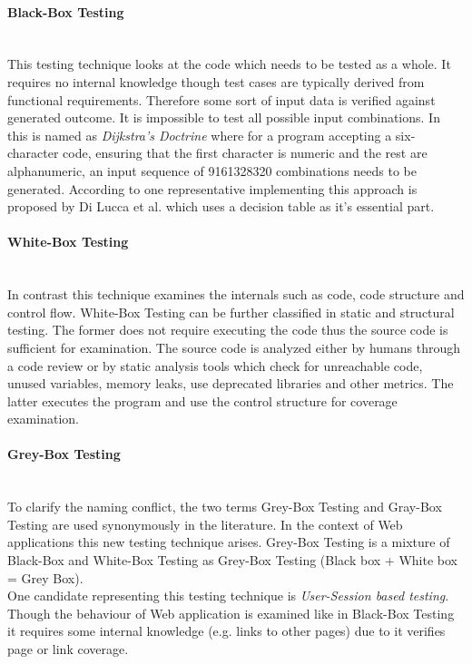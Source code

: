 \documentclass[12pt, notitlepage]{article}
\begin{document}
\paragraph{Black-Box Testing} ~\\
This testing technique looks at the code which needs to be tested as a whole. It requires no internal knowledge though test cases are typically 
derived from functional requirements. Therefore some sort of input data is verified against generated outcome.
It is impossible to test all possible input combinations. In \cite{softare-testing-principles} this is named as \textit{Dijkstra's Doctrine}
where for a program accepting a six-character code, ensuring that the first character is numeric and the rest are alphanumeric, an input 
sequence of 9161328320 combinations needs to be generated.
According to \cite{testing-overview} one representative implementing this approach is proposed by Di Lucca et al.\cite{decision-table-testing} which uses a decision table as it's essential part.  
\paragraph{White-Box Testing} ~\\
In contrast this technique examines the internals such as code, code structure and control flow. White-Box Testing can be further classified in
static and structural testing. The former does not require executing the code thus the source code is sufficient for examination. The source code
is analyzed either by humans through a code review or by static analysis tools which check for unreachable code, unused variables, memory leaks, use
deprecated libraries and other metrics. The latter executes the program and use the control structure for coverage examination\cite{structural-testing}.
\paragraph{Grey-Box Testing} ~\\
To clarify the naming conflict, the two terms Grey-Box Testing and Gray-Box Testing are used synonymously in the literature\cite{bridge-grey}. 
In the context of Web applications this new testing technique arises\cite{web-engineering}. Grey-Box Testing is a mixture of Black-Box and White-Box Testing as Grey-Box Testing (Black box + White box = Grey Box).\\
One candidate representing this testing technique is \textit{User-Session based testing}. Though the behaviour of Web application is examined like in
Black-Box Testing it requires some internal knowledge (e.g. links to other pages) due to it verifies page or link coverage.
\end{document}
